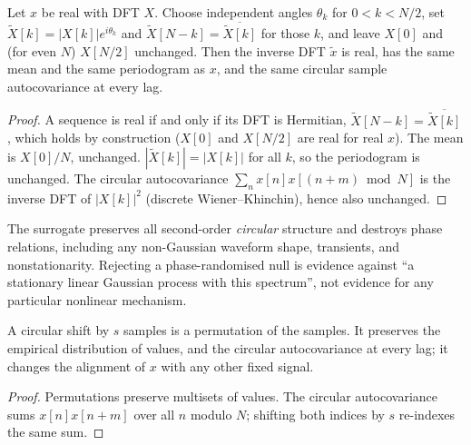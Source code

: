 \begin{theorem}\label{ars:spec-005}
Let $x$ be real with DFT $X$. Choose independent angles $\theta_k$ for $0<k<N/2$, set $\tilde X[k]=|X[k]|e^{i\theta_k}$ and $\tilde X[N-k]=\overline{\tilde X[k]}$ for those $k$, and leave $X[0]$ and (for even $N$) $X[N/2]$ unchanged. Then the inverse DFT $\tilde x$ is real, has the same mean and the same periodogram as $x$, and the same circular sample autocovariance at every lag.
\end{theorem}
\begin{proof}
A sequence is real if and only if its DFT is Hermitian, $\tilde X[N-k]=\overline{\tilde X[k]}$, which holds by construction ($X[0]$ and $X[N/2]$ are real for real $x$). The mean is $X[0]/N$, unchanged. $|\tilde X[k]|=|X[k]|$ for all $k$, so the periodogram is unchanged. The circular autocovariance $\sum_nx[n]x[(n+m)\bmod N]$ is the inverse DFT of $|X[k]|^2$ (discrete Wiener--Khinchin), hence also unchanged.
\end{proof}
The surrogate preserves all second-order \emph{circular} structure and destroys phase relations, including any non-Gaussian waveform shape, transients, and nonstationarity. Rejecting a phase-randomised null is evidence against ``a stationary linear Gaussian process with this spectrum'', not evidence for any particular nonlinear mechanism.

\begin{theorem}\label{ars:spec-006}
A circular shift by $s$ samples is a permutation of the samples. It preserves the empirical distribution of values, and the circular autocovariance at every lag; it changes the alignment of $x$ with any other fixed signal.
\end{theorem}
\begin{proof}
Permutations preserve multisets of values. The circular autocovariance sums $x[n]x[n+m]$ over all $n$ modulo $N$; shifting both indices by $s$ re-indexes the same sum.
\end{proof}

